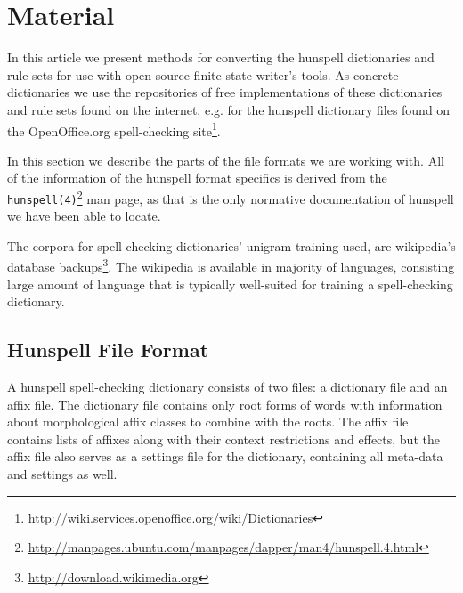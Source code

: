 \documentclass[a4paper,runningheads]{llncs}
\begin{document}
\section{Material}
\label{sec:material}

In this article we present methods for converting the hunspell 
dictionaries and rule sets for use with open-source finite-state
writer's tools.  As concrete dictionaries we use the repositories of
free implementations of these dictionaries and rule sets found on the
internet, e.g. for the hunspell dictionary files found on the
OpenOffice.org spell-checking
site\footnote{\url{http://wiki.services.openoffice.org/wiki/Dictionaries}}.

In this section we describe the parts of the file formats we are
working with. All of the information of the hunspell format specifics
is derived from the
\texttt{hunspell(4)}\footnote{\url{http://manpages.ubuntu.com/manpages/dapper/man4/hunspell.4.html}}
man page, as that is the only normative documentation of hunspell we
have been able to locate. 

The corpora for spell-checking dictionaries' unigram training used, are
wikipedia's database backups\footnote{\url{http://download.wikimedia.org}}. The
wikipedia is available in majority of languages, consisting large amount of
language that is typically well-suited for training a spell-checking dictionary.


\subsection{Hunspell File Format}
\label{subsec:material-hunspell}

A hunspell spell-checking dictionary consists of two files: a
dictionary file and an affix file. The dictionary file contains only
root forms of words with information about morphological affix classes
to combine with the roots.  The affix file contains lists of affixes
along with their context restrictions and effects, but the affix file
also serves as a settings file for the dictionary, containing all
meta-data and settings as well.
\end{document}
